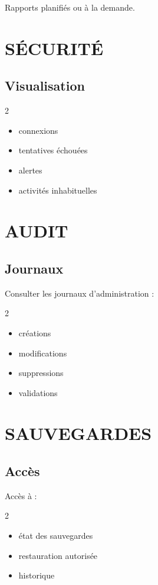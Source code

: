\documentclass[12pt,a4paper,oneside]{book}
\begin{document}
Rapports planifiés ou à la demande.

\chapter{SÉCURITÉ}

\section{Visualisation}
\begin{multicols}{2}
\begin{itemize}
\item connexions
\item tentatives échouées
\item alertes
\item activités inhabituelles
\end{itemize}
\end{multicols}

\chapter{AUDIT}

\section{Journaux}
Consulter les journaux d'administration :
\begin{multicols}{2}
\begin{itemize}
\item créations
\item modifications
\item suppressions
\item validations
\end{itemize}
\end{multicols}

\chapter{SAUVEGARDES}

\section{Accès}
Accès à :
\begin{multicols}{2}
\begin{itemize}
\item état des sauvegardes
\item restauration autorisée
\item historique
\end{itemize}
\end{multicols}
\end{document}
